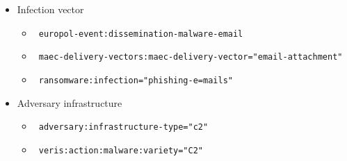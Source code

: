 \begin{frame}
    \begin{itemize}
        \item Infection vector
        \begin{itemize}
            \item \texttt{\color{black} europol-event:dissemination-malware-email}
            \item \texttt{\color{black} \tiny maec-delivery-vectors:maec-delivery-vector="email-attachment"}
            \item \texttt{\color{black} ransomware:infection="phishing-e=mails"}
        \end{itemize}
        \item Adversary infrastructure
        \begin{itemize}
            \item \texttt{\color{black} adversary:infrastructure-type="c2"}
            \item \texttt{\color{black} veris:action:malware:variety="C2"}
        \end{itemize}
    \end{itemize}
\end{frame}

